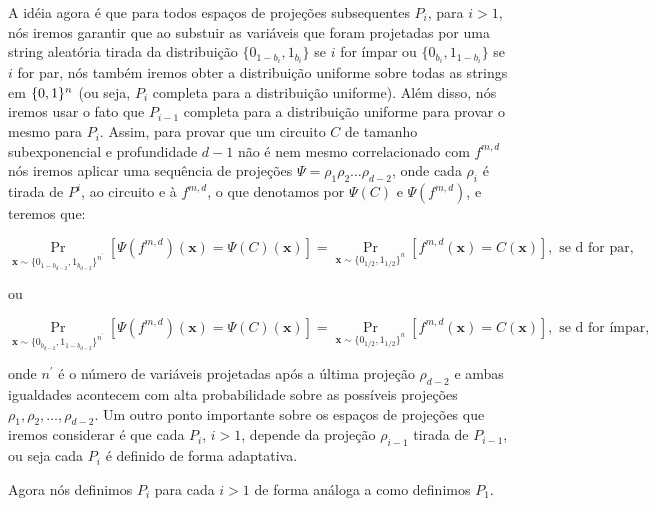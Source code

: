 A idéia agora é que para todos espaços de projeções subsequentes $P_{i}$, para $i > 1$, nós iremos garantir que ao substuir as variáveis que foram projetadas por uma string aleatória tirada da distribuição $\{0_{1 - b_{i}}, 1_{b_{i}}\}$ se $i$ for ímpar ou $\{0_{b_{i}}, 1_{1 - b_{i}}\}$ se $i$ for par, nós também iremos obter a distribuição uniforme sobre todas as strings em $\{0, 1\}^{n}$ (ou seja, $P_{i}$ completa para a distribuição uniforme). Além disso, nós iremos usar o fato que $P_{i - 1}$ completa para a distribuição uniforme para provar o mesmo para $P_{i}$. Assim, para provar que um circuito $C$ de tamanho subexponencial e profundidade $d - 1$ não é nem mesmo correlacionado com $f^{m, d}$ nós iremos aplicar uma sequência de projeções $\Psi = \rho_{1}\rho_{2}\dots\rho_{d - 2}$, onde cada $\rho_{i}$ é tirada de $P^{i}$, ao circuito e à $f^{m, d}$, o que denotamos por $\Psi(C)$ e $\Psi(f^{m, d})$, e teremos que:

\begin{equation*}
	\Pr_{\textbf{x} \sim \{0_{1 - b_{d - 2}}, 1_{b_{d - 2}}\}^{n^\prime}}[ \Psi(f^{m, d})(\textbf{x}) = \Psi(C)(\textbf{x})] = \Pr_{\textbf{x} \sim \{0_{1/2}, 1_{1/2}\}^{n}}[f^{m, d}(\textbf{x}) = C(\textbf{x})], \text{ se d for par},
\end{equation*}

ou

\begin{equation*}
	\Pr_{\textbf{x} \sim \{0_{b_{d - 2}}, 1_{1 - b_{d - 2}}\}^{n^{\prime}}}[ \Psi(f^{m, d})(\textbf{x}) = \Psi(C)(\textbf{x})] = \Pr_{\textbf{x} \sim \{0_{1/2}, 1_{1/2}\}^{n}}[f^{m, d}(\textbf{x}) = C(\textbf{x})], \text{ se d for ímpar},
\end{equation*}

onde $n^{\prime}$ é o número de variáveis projetadas após a última projeção $\rho_{d - 2}$ e ambas igualdades acontecem com alta probabilidade sobre as possíveis projeções $\rho_{1}, \rho_{2}, \dots, \rho_{d - 2}$. Um outro ponto importante sobre os espaços de projeções que iremos considerar é que cada $P_{i}$, $i > 1$, depende da projeção $\rho_{i - 1}$ tirada de $P_{i - 1}$, ou seja cada $P_{i}$ é definido de forma adaptativa.

Agora nós definimos $P_{i}$ para cada $i > 1$ de forma análoga a como definimos $P_{1}$.

